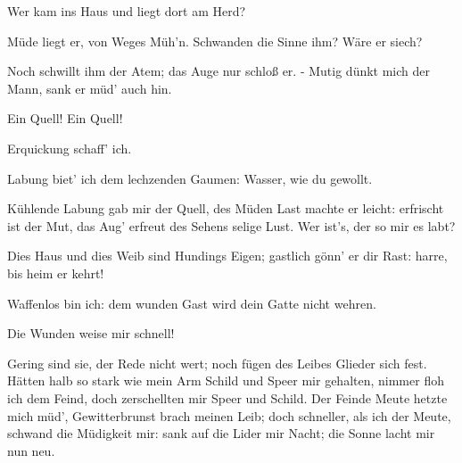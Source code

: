 \begin{drama}

Wer kam ins Haus und liegt dort am Herd?


Müde liegt er, von Weges Müh'n.
Schwanden die Sinne ihm? Wäre er siech?


Noch schwillt ihm der Atem; das Auge nur schloß er. -
Mutig dünkt mich der Mann, sank er müd' auch hin.
 

\Siegmundspeaks


Ein Quell! Ein Quell!
 

\Sieglindespeaks
Erquickung schaff' ich.


Labung biet' ich dem lechzenden Gaumen:
Wasser, wie du gewollt.
 




\Siegmundspeaks
Kühlende Labung gab mir der Quell,
des Müden Last machte er leicht:
erfrischt ist der Mut,
das Aug' erfreut des Sehens selige Lust.
Wer ist's, der so mir es labt?
 

\Sieglindespeaks
Dies Haus und dies Weib sind Hundings Eigen;
gastlich gönn' er dir Rast: harre, bis heim er kehrt!
 

\Siegmundspeaks
Waffenlos bin ich:
dem wunden Gast wird dein Gatte nicht wehren.
 

\Sieglindespeaks


Die Wunden weise mir schnell!
 

\Siegmundspeaks


Gering sind sie, der Rede nicht wert;
noch fügen des Leibes Glieder sich fest.
Hätten halb so stark wie mein Arm
Schild und Speer mir gehalten,
nimmer floh ich dem Feind,
doch zerschellten mir Speer und Schild.
Der Feinde Meute hetzte mich müd',
Gewitterbrunst brach meinen Leib;
doch schneller, als ich der Meute,
schwand die Müdigkeit mir:
sank auf die Lider mir Nacht;
die Sonne lacht mir nun neu.
 


\end{drama}
